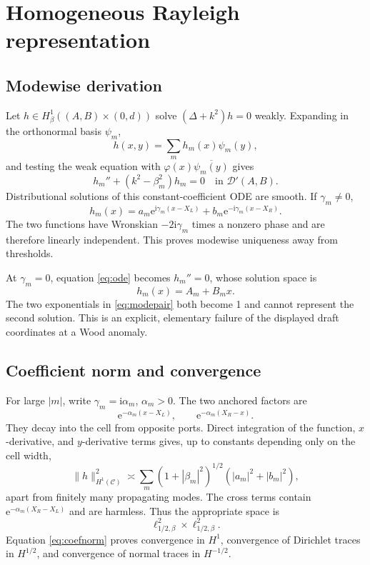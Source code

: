 \documentclass[11pt]{article}
\newcommand{\C}{\mathcal C}
\newcommand{\ii}{\mathrm i}
\newcommand{\ee}{\mathrm e}
\theoremstyle{plain}
\theoremstyle{definition}
\theoremstyle{remark}
\begin{document}
\section{Homogeneous Rayleigh representation}
\label{sec:rayleigh}

\subsection{Modewise derivation}

Let \(h\in H^1_\beta((A,B)\times(0,d))\) solve
\((\Delta+k^2)h=0\) weakly.  Expanding in the orthonormal basis \(\psi_m\),
\[
h(x,y)=\sum_m h_m(x)\psi_m(y),
\]
and testing the weak equation with \(\varphi(x)\overline{\psi_m(y)}\) gives
\begin{equation}
h_m''+(k^2-\beta_m^2)h_m=0
\quad\text{in }\mathcal D'(A,B).
\label{eq:ode}
\end{equation}
Distributional solutions of this constant-coefficient ODE are smooth.  If
\(\gamma_m\neq0\),
\begin{equation}
h_m(x)=a_m\ee^{\ii\gamma_m(x-X_L)}
+b_m\ee^{-\ii\gamma_m(x-X_R)}.
\label{eq:modepair}
\end{equation}
The two functions have Wronskian \(-2\ii\gamma_m\) times a nonzero phase and
are therefore linearly independent.  This proves modewise uniqueness away
from thresholds.

At \(\gamma_m=0\), equation \eqref{eq:ode} becomes \(h_m''=0\), whose solution
space is
\begin{equation}
h_m(x)=A_m+B_mx.
\label{eq:threshold}
\end{equation}
The two exponentials in \eqref{eq:modepair} both become 1 and cannot represent
the second solution.  This is an explicit, elementary failure of the displayed
draft coordinates at a Wood anomaly.

\subsection{Coefficient norm and convergence}

For large \(|m|\), write \(\gamma_m=\ii\alpha_m\), \(\alpha_m>0\).  The two
anchored factors are
\[
\ee^{-\alpha_m(x-X_L)},\qquad
\ee^{-\alpha_m(X_R-x)}.
\]
They decay into the cell from opposite ports.  Direct integration of the
function, \(x\)-derivative, and \(y\)-derivative terms gives, up to constants
depending only on the cell width,
\begin{equation}
\|h\|_{H^1(\C)}^2\asymp
\sum_m(1+|\beta_m|^2)^{1/2}(|a_m|^2+|b_m|^2),
\label{eq:coefnorm}
\end{equation}
apart from finitely many propagating modes.  The cross terms contain
\(\ee^{-\alpha_m(X_R-X_L)}\) and are harmless.  Thus the appropriate space is
\[
\ell^2_{1/2,\beta}\times\ell^2_{1/2,\beta}.
\]
Equation \eqref{eq:coefnorm} proves convergence in \(H^1\), convergence of
Dirichlet traces in \(H^{1/2}\), and convergence of normal traces in
\(H^{-1/2}\).
\end{document}
